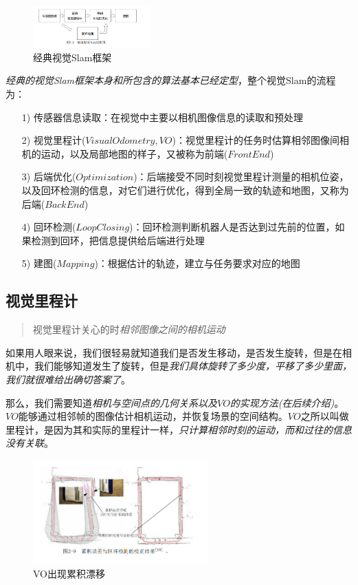 \begin{figure}[!htbp]
    \centering
    \includegraphics[width=0.4\textwidth]{image/chapter01/视觉Slam框架.png}
    \caption{经典视觉Slam框架}
\end{figure}

    \emph{经典的视觉Slam框架本身和所包含的算法基本已经定型}，整个视觉Slam的流程为：

\begin{itemize}
    \item [1)] 传感器信息读取：在视觉中主要以相机图像信息的读取和预处理
    \item [2)] 视觉里程计($Visual Odometry, VO$)：视觉里程计的任务时估算相邻图像间相机的运动，以及局部地图的样子，又被称为前端($Front End$)
    \item [3)] 后端优化($Optimization$)：后端接受不同时刻视觉里程计测量的相机位姿，以及回环检测的信息，对它们进行优化，得到全局一致的轨迹和地图，又称为后端($Back End$)
    \item [4)] 回环检测($Loop Closing$)：回环检测判断机器人是否达到过先前的位置，如果检测到回环，把信息提供给后端进行处理
    \item [5)] 建图($Mapping$)：根据估计的轨迹，建立与任务要求对应的地图
\end{itemize}

\subsection{视觉里程计}

\begin{quote}
    \centering
    视觉里程计关心的时\emph{相邻图像之间的相机运动}
\end{quote}

    如果用人眼来说，我们很轻易就知道我们是否发生移动，是否发生旋转，但是在相机中，我们能够知道发生了旋转，但是\emph{我们具体旋转了多少度，平移了多少里面，我们就很难给出确切答案了}。
    
    那么，我们需要知道\emph{相机与空间点的几何关系以及$VO$的实现方法(在后续介绍)}。$VO$能够通过相邻帧的图像估计相机运动，并恢复场景的空间结构。$VO$之所以叫做里程计，是因为其和实际的里程计一样，\emph{只计算相邻时刻的运动，而和过往的信息没有关联}。
    
\begin{figure}[!htbp]
    \centering
    \includegraphics[width=0.6\textwidth]{image/chapter01/回环误差.png}
    \caption{VO出现累积漂移}
\end{figure}

